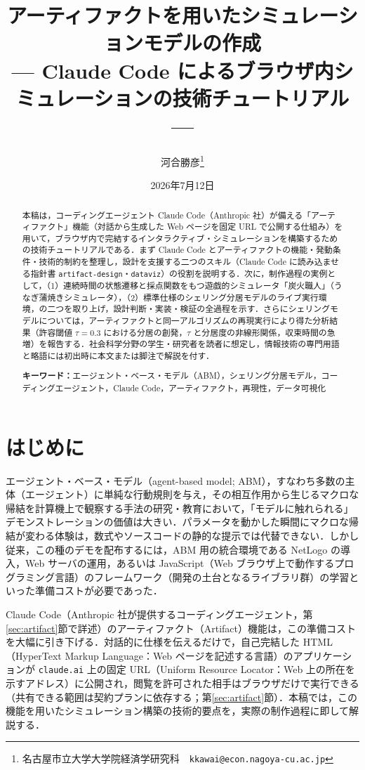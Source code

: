 \documentclass[a4paper]{jlreq}
\title{{\Large アーティファクトを用いたシミュレーションモデルの作成}\\
  {\small --- Claude Code によるブラウザ内シミュレーションの技術チュートリアル ---}}
\author{河合勝彦\thanks{名古屋市立大学大学院経済学研究科　\texttt{kkawai@econ.nagoya-cu.ac.jp}}}
\date{2026年7月12日}
\begin{document}
\maketitle

\begin{abstract}
本稿は，コーディングエージェント Claude Code（Anthropic 社）が備える「アーティファクト」機能（対話から生成した Web ページを固定 URL で公開する仕組み）を用いて，ブラウザ内で完結するインタラクティブ・シミュレーションを構築するための技術チュートリアルである．まず Claude Code とアーティファクトの機能・発動条件・技術的制約を整理し，設計を支援する二つのスキル（Claude Code に読み込ませる指針書 \texttt{artifact-design}・\texttt{dataviz}）の役割を説明する．次に，制作過程の実例として，（1）連続時間の状態遷移と採点関数をもつ遊戯的シミュレータ「炭火職人」（うなぎ蒲焼きシミュレータ），（2）標準仕様のシェリング分居モデルのライブ実行環境，の二つを取り上げ，設計判断・実装・検証の全過程を示す．さらにシェリングモデルについては，アーティファクトと同一アルゴリズムの再現実行により得た分析結果（許容閾値 $\tau=0.3$ における分居の創発，$\tau$ と分居度の非線形関係，収束時間の急増）を報告する．社会科学分野の学生・研究者を読者に想定し，情報技術の専門用語と略語には初出時に本文または脚注で解説を付す．

\par\bigskip\noindent
\textbf{キーワード：}エージェント・ベース・モデル（ABM），シェリング分居モデル，コーディングエージェント，Claude Code，アーティファクト，再現性，データ可視化
\end{abstract}

\tableofcontents

\section{はじめに}

エージェント・ベース・モデル（agent-based model; ABM），すなわち多数の主体（エージェント）に単純な行動規則を与え，その相互作用から生じるマクロな帰結を計算機上で観察する手法の研究・教育において，「モデルに触れられる」デモンストレーションの価値は大きい．パラメータを動かした瞬間にマクロな帰結が変わる体験は，数式やソースコードの静的な提示では代替できない．しかし従来，この種のデモを配布するには，ABM 用の統合環境である NetLogo の導入，Web サーバの運用，あるいは JavaScript（Web ブラウザ上で動作するプログラミング言語）のフレームワーク（開発の土台となるライブラリ群）の学習といった準備コストが必要であった．

Claude Code（Anthropic 社が提供するコーディングエージェント，第\ref{sec:artifact}節で詳述）のアーティファクト（Artifact）機能は，この準備コストを大幅に引き下げる．対話的に仕様を伝えるだけで，自己完結した HTML（HyperText Markup Language：Web ページを記述する言語）のアプリケーションが \texttt{claude.ai} 上の固定 URL（Uniform Resource Locator：Web 上の所在を示すアドレス）に公開され，閲覧を許可された相手はブラウザだけで実行できる（共有できる範囲は契約プランに依存する；第\ref{sec:artifact}節）．本稿では，この機能を用いたシミュレーション構築の技術的要点を，実際の制作過程に即して解説する．
\end{document}

